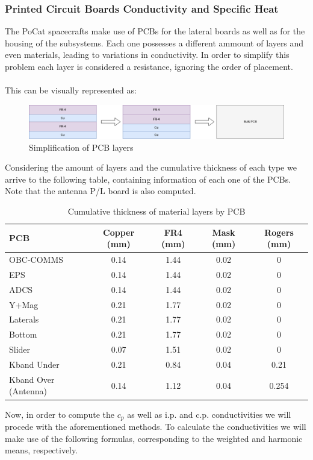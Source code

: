 \subsubsection{Printed Circuit Boards Conductivity and Specific Heat}
The PoCat spacecrafts make use of PCBs for the lateral boards as well as for the housing of the 
subsystems. Each one possesses a different ammount of layers and even materials, leading to variations
in conductivity. In order to simplify this problem each layer is considered a resistance, ignoring
the order of placement.
\paragraph{}
This can be visually represented as:

\begin{figure}[H]
    \centering
    \includegraphics[width=1\linewidth]{res/img/5_simulationanalisys/resistances.png}
    \caption{Simplification of PCB layers}
    \label{fig:simpresist}
\end{figure}

Considering the amount of layers and the cumulative thickness of each type we arrive to the following
table, containing information of each one of the PCBs. Note that the antenna P/L board is also computed.

\begin{table}[H]
  \centering
  \begin{tabular}{lcccc}
      \toprule
      \textbf{PCB} & \textbf{Copper (mm)} & \textbf{FR4 (mm)} & \textbf{Mask (mm)} & \textbf{Rogers (mm)} \\
      \midrule
      OBC-COMMS            & 0.14 & 1.44 & 0.02 & 0     \\
      EPS                  & 0.14 & 1.44 & 0.02 & 0     \\
      ADCS                 & 0.14 & 1.44 & 0.02 & 0     \\
      Y+Mag                & 0.21 & 1.77 & 0.02 & 0     \\
      Laterals             & 0.21 & 1.77 & 0.02 & 0     \\
      Bottom               & 0.21 & 1.77 & 0.02 & 0     \\
      Slider               & 0.07 & 1.51 & 0.02 & 0     \\
      Kband Under          & 0.21 & 0.84 & 0.04 & 0.21  \\
      Kband Over (Antenna) & 0.14 & 1.12 & 0.04 & 0.254 \\
      \bottomrule
  \end{tabular}
  \caption{Cumulative thickness of material layers by PCB}
\end{table}
Now, in order to compute the $c_p$ as well as i.p. and c.p. conductivities we will procede with the aforementioned
methods. To calculate the conductivities we will make use of the following formulas, corresponding to the weighted and
harmonic means, respectively.
